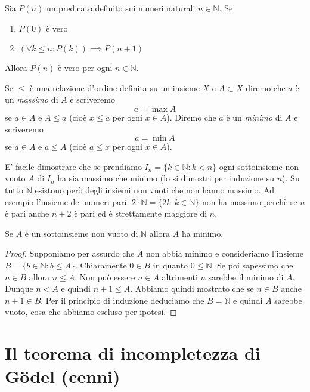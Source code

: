 \documentclass[italian,a4paper,hidelinks,headinclude]{scrartcl}
\newcommand{\NN}{{\mathbb N}}
\begin{document}
\begin{theorem}
Sia $P(n)$ un predicato definito sui numeri naturali $n\in \NN$.
Se
\begin{enumerate}
\item $P(0)$ è vero
\item $(\forall k\le n\colon P(k))\implies P(n+1)$
\end{enumerate}
Allora $P(n)$ è vero per ogni $n\in \NN$.
\end{theorem}

\begin{definition}
  Se $\le$ è una relazione d'ordine definita su un insieme $X$ e
  $A\subset X$ diremo che $a$ è un \emph{massimo} di $A$ e
  scriveremo
  \[
    a = \max A
  \]
  se $a\in A$ e $A\le a$ (cioè $x\le a$ per ogni $x\in A$).
  Diremo che $a$ è un \emph{minimo} di $A$ e scriveremo
  \[
    a = \min A
  \]
  se $a\in A$ e $a\le A$ (cioè $a\le x$ per ogni $x\in A$).
\end{definition}

E' facile dimostrare che se prendiamo $I_n = \{k\in \NN\colon k<n\}$
ogni sottoinsieme non vuoto $A$ di $I_n$ ha sia massimo che minimo
(lo si dimostri per induzione su $n$). Su tutto $\NN$ esistono
però degli insiemi non vuoti che non hanno massimo. Ad esempio l'insieme
dei numeri pari:
$2\cdot \NN = \{2k\colon k\in \NN\}$ non ha massimo perchè se $n$ è pari
anche $n+2$ è pari ed è strettamente maggiore di $n$.

\begin{theorem}[buon ordinamento di $\NN$]
Se $A$ è un sottoinsieme non vuoto di $\NN$ allora
$A$ ha minimo.
\end{theorem}
%
\begin{proof}
Supponiamo per assurdo che $A$ non abbia minimo e consideriamo l'insieme
$B=\{b\in \NN\colon b \le A\}$.
Chiaramente $0\in B$ in quanto $0\le \NN$. Se poi sapessimo che $n\in B$
allora $n\le A$. Non può essere $n\in A$ altrimenti $n$ sarebbe il minimo di $A$.
Dunque $n < A$ e quindi $n+1 \le A$. Abbiamo quindi mostrato che se $n\in B$ anche $n+1\in B$.
Per il principio di induzione deduciamo che $B=\NN$ e quindi $A$ sarebbe vuoto,
cosa che abbiamo escluso per ipotesi.
\end{proof}


\section{Il teorema di incompletezza di G\"odel (cenni)}
\end{document}
